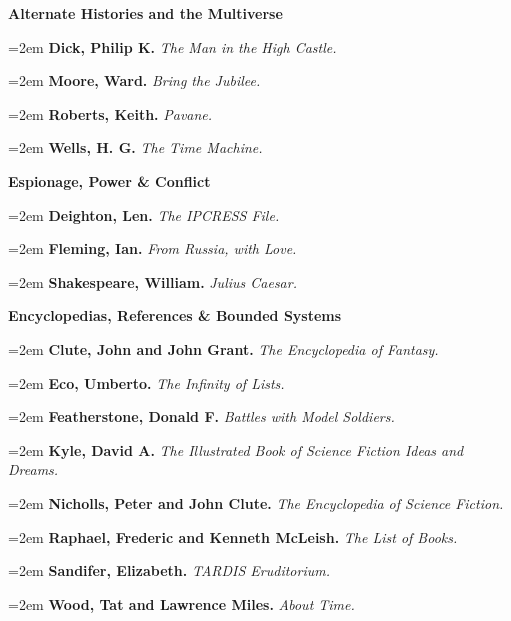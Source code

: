 \bigskip
{\bf Alternate Histories and the Multiverse} \par\smallskip

\par\noindent\hangindent=2em {\bf Dick, Philip K.} {\it The Man in the High Castle.} \par
\par\noindent\hangindent=2em {\bf Moore, Ward.} {\it Bring the Jubilee.} \par
\par\noindent\hangindent=2em {\bf Roberts, Keith.} {\it Pavane.} \par
\par\noindent\hangindent=2em {\bf Wells, H. G.} {\it The Time Machine.} \par

\bigskip
{\bf Espionage, Power \& Conflict} \par\smallskip

\par\noindent\hangindent=2em {\bf Deighton, Len.} {\it The IPCRESS File.} \par
\par\noindent\hangindent=2em {\bf Fleming, Ian.} {\it From Russia, with Love.} \par
\par\noindent\hangindent=2em {\bf Shakespeare, William.} {\it Julius Caesar.} \par

\bigskip
{\bf Encyclopedias, References \& Bounded Systems} \par\smallskip

\par\noindent\hangindent=2em {\bf Clute, John and John Grant.} {\it The Encyclopedia of Fantasy.} \par
\par\noindent\hangindent=2em {\bf Eco, Umberto.} {\it The Infinity of Lists.} \par
\par\noindent\hangindent=2em {\bf Featherstone, Donald F.} {\it Battles with Model Soldiers.} \par
\par\noindent\hangindent=2em {\bf Kyle, David A.} {\it The Illustrated Book of Science Fiction Ideas and Dreams.} \par
\par\noindent\hangindent=2em {\bf Nicholls, Peter and John Clute.} {\it The Encyclopedia of Science Fiction.} \par
\par\noindent\hangindent=2em {\bf Raphael, Frederic and Kenneth McLeish.} {\it The List of Books.} \par
\par\noindent\hangindent=2em {\bf Sandifer, Elizabeth.} {\it TARDIS Eruditorium.} \par
\par\noindent\hangindent=2em {\bf Wood, Tat and Lawrence Miles.} {\it About Time.} \par

